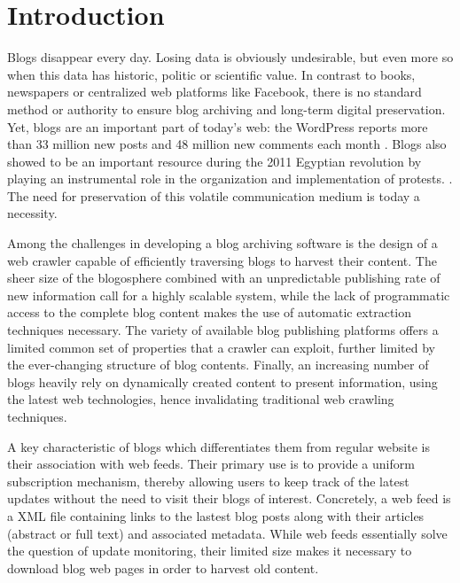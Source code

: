 \section{Introduction}

Blogs disappear every day. Losing data is obviously undesirable, but even more so when this data has historic, politic or scientific value. In contrast to books, newspapers or centralized web platforms like Facebook, there is no standard method or authority to ensure blog archiving and long-term digital preservation. Yet, blogs are an important part of today's web: the WordPress reports more than 33 million new posts and 48 million new comments each month \cite{wordpress2014}. Blogs also showed to be an important resource during the 2011 Egyptian revolution by playing an instrumental role in the organization and implementation of protests. \cite{nahedeltantawy2012}. The need for preservation of this volatile communication medium is today a necessity. 

Among the challenges in developing a blog archiving software is the design of a web crawler capable of efficiently traversing blogs to harvest their content. The sheer size of the blogosphere combined with an unpredictable publishing rate of new information call for a highly scalable system, while the lack of programmatic access to the complete blog content makes the use of automatic extraction techniques necessary. The variety of available blog publishing platforms offers a limited common set of properties that a crawler can exploit, further limited by the ever-changing structure of blog contents. Finally, an increasing number of blogs heavily rely on dynamically created content to present information, using the latest web technologies, hence invalidating traditional web crawling techniques.

A key characteristic of blogs which differentiates them from regular website is their association with web feeds. Their primary use is to provide a uniform subscription mechanism, thereby allowing users to keep track of the latest updates without the need to visit their blogs of interest. Concretely, a web feed is a XML file containing links to the lastest blog posts along with their articles (abstract or full text) and associated metadata. While web feeds essentially solve the question of update monitoring, their limited size makes it necessary to download blog web pages in order to harvest old content.


